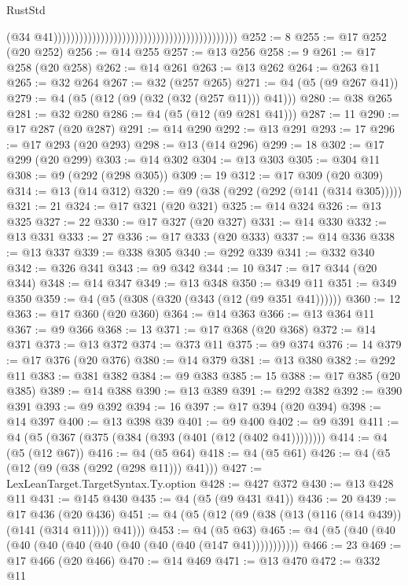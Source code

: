 \begin{lexlean}{RustStd}
\begin{coremodule}
                                                                                        (@34
                                                                                          @41)))))))))))))))))))))))))))))))))))))))))))
@252 := 8
@255 := @17 @252 (@20 @252)
@256 := @14 @255
@257 := @13 @256
@258 := 9
@261 := @17 @258 (@20 @258)
@262 := @14 @261
@263 := @13 @262
@264 := @263 @11
@265 := @32 @264
@267 := @32 (@257 @265)
@271 := @4 (@5 (@9 @267 @41))
@279 := @4 (@5 (@12 (@9 (@32 (@32 (@257 @11))) @41)))
@280 := @38 @265
@281 := @32 @280
@286 := @4 (@5 (@12 (@9 @281 @41)))
@287 := 11
@290 := @17 @287 (@20 @287)
@291 := @14 @290
@292 := @13 @291
@293 := 17
@296 := @17 @293 (@20 @293)
@298 := @13 (@14 @296)
@299 := 18
@302 := @17 @299 (@20 @299)
@303 := @14 @302
@304 := @13 @303
@305 := @304 @11
@308 := @9 (@292 (@298 @305))
@309 := 19
@312 := @17 @309 (@20 @309)
@314 := @13 (@14 @312)
@320 := @9 (@38 (@292 (@292 (@141 (@314 @305)))))
@321 := 21
@324 := @17 @321 (@20 @321)
@325 := @14 @324
@326 := @13 @325
@327 := 22
@330 := @17 @327 (@20 @327)
@331 := @14 @330
@332 := @13 @331
@333 := 27
@336 := @17 @333 (@20 @333)
@337 := @14 @336
@338 := @13 @337
@339 := @338 @305
@340 := @292 @339
@341 := @332 @340
@342 := @326 @341
@343 := @9 @342
@344 := 10
@347 := @17 @344 (@20 @344)
@348 := @14 @347
@349 := @13 @348
@350 := @349 @11
@351 := @349 @350
@359 := @4 (@5 (@308 (@320 (@343 (@12 (@9 @351 @41))))))
@360 := 12
@363 := @17 @360 (@20 @360)
@364 := @14 @363
@366 := @13 @364 @11
@367 := @9 @366
@368 := 13
@371 := @17 @368 (@20 @368)
@372 := @14 @371
@373 := @13 @372
@374 := @373 @11
@375 := @9 @374
@376 := 14
@379 := @17 @376 (@20 @376)
@380 := @14 @379
@381 := @13 @380
@382 := @292 @11
@383 := @381 @382
@384 := @9 @383
@385 := 15
@388 := @17 @385 (@20 @385)
@389 := @14 @388
@390 := @13 @389
@391 := @292 @382
@392 := @390 @391
@393 := @9 @392
@394 := 16
@397 := @17 @394 (@20 @394)
@398 := @14 @397
@400 := @13 @398 @39
@401 := @9 @400
@402 := @9 @391
@411 := @4 (@5 (@367 (@375 (@384 (@393 (@401 (@12 (@402 @41))))))))
@414 := @4 (@5 (@12 @67))
@416 := @4 (@5 @64)
@418 := @4 (@5 @61)
@426 := @4 (@5 (@12 (@9 (@38 (@292 (@298 @11))) @41)))
@427 := LexLeanTarget.TargetSyntax.Ty.option
@428 := @427 @372
@430 := @13 @428 @11
@431 := @145 @430
@435 := @4 (@5 (@9 @431 @41))
@436 := 20
@439 := @17 @436 (@20 @436)
@451 := @4 (@5 (@12 (@9 (@38 (@13 (@116 (@14 @439)) (@141 (@314 @11)))) @41)))
@453 := @4 (@5 @63)
@465 := @4 (@5 (@40 (@40 (@40 (@40 (@40 (@40 (@40 (@40 (@40 (@147 @41)))))))))))
@466 := 23
@469 := @17 @466 (@20 @466)
@470 := @14 @469
@471 := @13 @470
@472 := @332 @11

\end{coremodule}
\end{lexlean}
